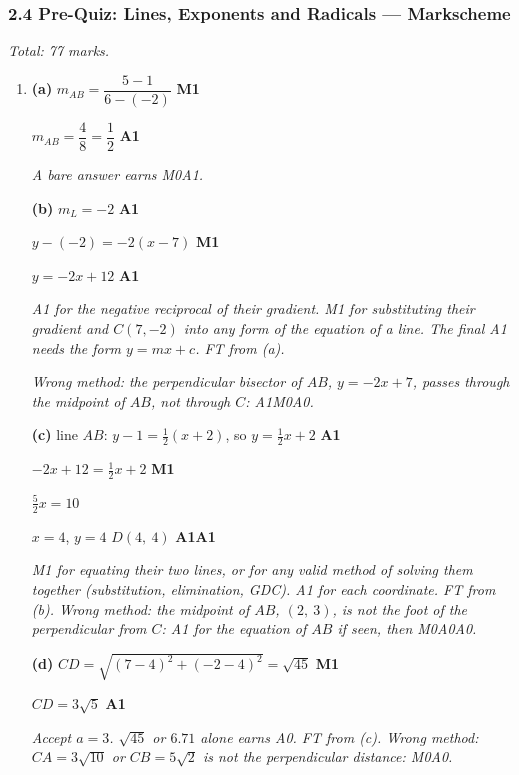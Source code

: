 \documentclass[12pt, twoside]{article}
\begin{document}
\subsubsection*{2.4 Pre-Quiz: Lines, Exponents and Radicals --- Markscheme}

\emph{Total: 77 marks.}

\begin{enumerate}[itemsep=0.3cm]

\item[1.] [Maximum mark: 14]

\textbf{(a)} $m_{AB} = \dfrac{5 - 1}{6 - (-2)}$ \hfill \textbf{M1}

$m_{AB} = \dfrac{4}{8} = \dfrac{1}{2}$ \hfill \textbf{A1}

\emph{A bare answer earns M0A1.}

\textbf{(b)} $m_{L} = -2$ \hfill \textbf{A1}

$y - (-2) = -2(x - 7)$ \hfill \textbf{M1}

$y = -2x + 12$ \hfill \textbf{A1}

\emph{A1 for the negative reciprocal of their gradient. M1 for substituting
their gradient and $C(7, -2)$ into any form of the equation of a line. The
final A1 needs the form $y = mx + c$. FT from (a).}

\emph{Wrong method: the perpendicular bisector of $AB$,
$y = -2x + 7$, passes through the midpoint of $AB$, not through $C$: A1M0A0.}

\textbf{(c)} line $AB$: $y - 1 = \frac{1}{2}(x + 2)$, so $y = \frac{1}{2}x + 2$ \hfill \textbf{A1}

$-2x + 12 = \frac{1}{2}x + 2$ \hfill \textbf{M1}

$\frac{5}{2}x = 10$

$x = 4$, \quad $y = 4$ \qquad $D(4,\ 4)$ \hfill \textbf{A1A1}

\emph{M1 for equating their two lines, or for any valid method of solving
them together (substitution, elimination, GDC). A1 for each coordinate. FT
from (b). Wrong method: the midpoint of $AB$, $(2,\ 3)$, is not the foot of
the perpendicular from $C$: A1 for the equation of $AB$ if seen, then
M0A0A0.}

\textbf{(d)} $CD = \sqrt{(7 - 4)^{2} + (-2 - 4)^{2}} = \sqrt{45}$ \hfill \textbf{M1}

$CD = 3\sqrt{5}$ \hfill \textbf{A1}

\emph{Accept $a = 3$. $\sqrt{45}$ or $6.71$ alone earns A0. FT from (c).
Wrong method: $CA = 3\sqrt{10}$ or $CB = 5\sqrt{2}$ is not the
perpendicular distance: M0A0.}


\end{enumerate}
\end{document}
